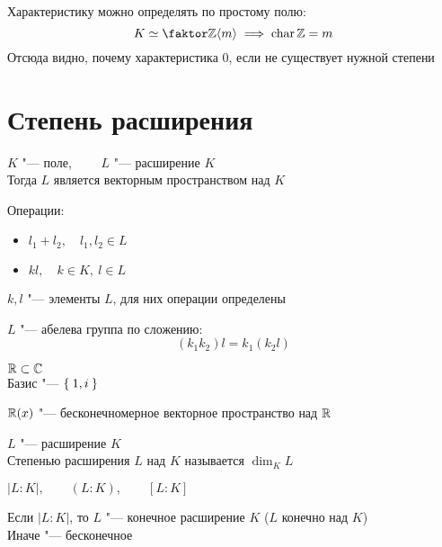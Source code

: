 \begin{remark}
	Характеристику можно определять по простому полю:
	$$ K \simeq \faktor\Z{\braket m} \implies \chara \Z = m $$
	Отсюда видно, почему характеристика 0, если не существует нужной степени
\end{remark}

\section{Степень расширения}

\begin{lemma}
	$ K $ "--- поле, $ \qquad L $ "--- расширение $ K $ \\
	Тогда $ L $ является векторным пространством над $ K $
\end{lemma}

\begin{iproof}
	\item Операции:
	\begin{itemize}
		\item $ l_1 + l_2, \quad l_1, l_2 \in L $
		\item $ kl, \quad k \in K, ~ l \in L $
	\end{itemize}
	$ k, l $ "--- элементы $ L $, для них операции определены
	\item $ L $ "--- абелева группа по сложению:
	$$ (k_1k_2)l = k_1(k_2l) $$
\end{iproof}

\begin{exmpls}
	\item $ \mathbb{R} \subset \mathbb{C} $ \\
	Базис "--- $ \Set{1, i} $
	\item $ \mathbb{R}(x) $ "--- бесконечномерное векторное пространство над $ \mathbb{R} $
\end{exmpls}

\begin{definition}
	$ L $ "--- расширение $ K $ \\
	Степенью расширения $ L $ над $ K $ называется $ \dim_K L $
\end{definition}

\begin{notation}
	$ |L : K|, \qquad (L : K), \qquad [L : K] $
\end{notation}

Если $ |L : K| $, то $ L $ "--- конечное расширение $ K $ ($ L $ конечно над $ K $) \\
Иначе "--- бесконечное

